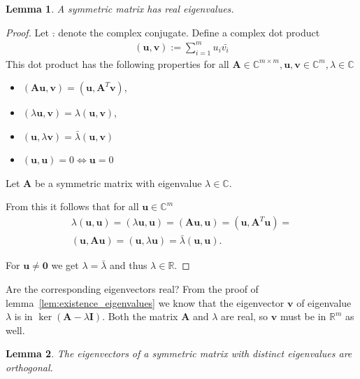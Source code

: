 \documentclass[a4paper]{IEEEtran}
\newtheorem{lemma}{Lemma}
\begin{document}
\begin{lemma}
	A symmetric matrix has real eigenvalues.
\end{lemma}

\begin{proof}
	Let $\bar{.}$ denote the complex conjugate. Define a complex dot product
	\begin{align*}
		(\mathbf{u}, \mathbf{v}) := \sum_{i=1}^{m} u_i \bar{v_i}
	\end{align*}
	This dot product has the following properties for all $\mathbf{A} \in \mathbb{C}^{m\times m}, \mathbf{u}, \mathbf{v} \in \mathbb{C}^m, \lambda \in \mathbb{C}$
	\begin{itemize}
		\item $(\mathbf{Au}, \mathbf{v}) = (\mathbf{u}, \mathbf{A}^T\mathbf{v})$,
		\item $(\lambda \mathbf{u}, \mathbf{v}) = \lambda(\mathbf{u}, \mathbf{v})$,
		\item $(\mathbf{u}, \lambda \mathbf{v}) = \bar{\lambda} (\mathbf{u}, \mathbf{v})$
		\item $(\mathbf{u}, \mathbf{u}) = 0 \iff \mathbf{u} = 0$
	\end{itemize}
	
	Let $\mathbf{A}$ be a symmetric matrix with eigenvalue $\lambda \in \mathbb{C}$.
	
	From this it follows that for all $\mathbf{u} \in \mathbb{C}^m$
	\begin{align*}
		\lambda (\mathbf{u}, \mathbf{u}) = (\lambda \mathbf{u}, \mathbf{u}) = (\mathbf{Au}, \mathbf{u}) = (\mathbf{u}, \mathbf{A}^T\mathbf{u}) =\\
		(\mathbf{u}, \mathbf{Au}) =	(\mathbf{u}, \lambda\mathbf{u}) = \bar{\lambda} (\mathbf{u}, \mathbf{u}).
	\end{align*}
	
	For $\mathbf{u} \neq \mathbf{0}$ we get $\lambda = \bar{\lambda}$ and thus $\lambda \in \mathbb{R}$.
\end{proof}

Are the corresponding eigenvectors real? From the proof of lemma~\ref{lem:existence_eigenvalues} we know that the eigenvector $\mathbf{v}$ of eigenvalue $\lambda$ is in $\ker(\mathbf{A} - \lambda\mathbf{I})$. Both the matrix $\mathbf{A}$ and $\lambda$ are real, so $\mathbf{v}$ must be in $\mathbb{R}^m$ as well.

\begin{lemma}
	\label{lem:symmetric_matrix_eigenvector_orthogonal}
	The eigenvectors of a symmetric matrix with distinct eigenvalues are orthogonal.
\end{lemma}
\end{document}
